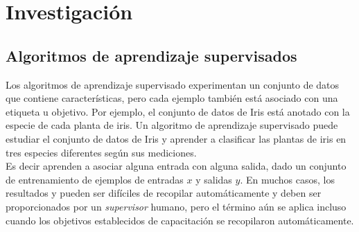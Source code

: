\section{Investigación}

\subsection{Algoritmos de aprendizaje supervisados}

Los algoritmos de aprendizaje supervisado experimentan un conjunto de datos que contiene 
características, pero cada ejemplo también está asociado con una etiqueta u objetivo. 
Por ejemplo, el conjunto de datos de Iris está anotado con la especie de cada planta de iris. 
Un algoritmo de aprendizaje supervisado puede estudiar el conjunto de datos de Iris y aprender 
a clasificar las plantas de iris en tres especies diferentes según sus mediciones.
\cite{Goodfellow-et-al-2016}\\ 

Es decir aprenden a asociar alguna entrada con alguna salida, dado un conjunto de entrenamiento 
de ejemplos de entradas $x$ y salidas $y$. En muchos casos, los resultados y pueden ser difíciles 
de recopilar automáticamente y deben ser proporcionados por un \textit{supervisor} humano, pero 
el término aún se aplica incluso cuando los objetivos establecidos de capacitación se 
recopilaron automáticamente.\cite{Goodfellow-et-al-2016}\\ 

